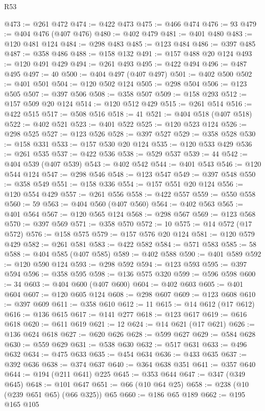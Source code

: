 \begin{lexlean}{R53}
\begin{coremodule}
@473 := @261 @472
@474 := @422 @473
@475 := @466 @474
@476 := 93
@479 := @404 @476 (@407 @476)
@480 := @402 @479
@481 := @401 @480
@483 := @120 @481 @124
@484 := @298 @483
@485 := @123 @484
@486 := @397 @485
@487 := @358 @486
@488 := @158 @132
@491 := @157 @488 @20 @124
@493 := @120 @491 @429
@494 := @261 @493
@495 := @422 @494
@496 := @487 @495
@497 := 40
@500 := @404 @497 (@407 @497)
@501 := @402 @500
@502 := @401 @501
@504 := @120 @502 @124
@505 := @298 @504
@506 := @123 @505
@507 := @397 @506
@508 := @358 @507
@509 := @158 @293
@512 := @157 @509 @20 @124
@514 := @120 @512 @429
@515 := @261 @514
@516 := @422 @515
@517 := @508 @516
@518 := 41
@521 := @404 @518 (@407 @518)
@522 := @402 @521
@523 := @401 @522
@525 := @120 @523 @124
@526 := @298 @525
@527 := @123 @526
@528 := @397 @527
@529 := @358 @528
@530 := @158 @331
@533 := @157 @530 @20 @124
@535 := @120 @533 @429
@536 := @261 @535
@537 := @422 @536
@538 := @529 @537
@539 := 44
@542 := @404 @539 (@407 @539)
@543 := @402 @542
@544 := @401 @543
@546 := @120 @544 @124
@547 := @298 @546
@548 := @123 @547
@549 := @397 @548
@550 := @358 @549
@551 := @158 @336
@554 := @157 @551 @20 @124
@556 := @120 @554 @429
@557 := @261 @556
@558 := @422 @557
@559 := @550 @558
@560 := 59
@563 := @404 @560 (@407 @560)
@564 := @402 @563
@565 := @401 @564
@567 := @120 @565 @124
@568 := @298 @567
@569 := @123 @568
@570 := @397 @569
@571 := @358 @570
@572 := 10
@575 := @14 @572 (@17 @572)
@576 := @158 @575
@579 := @157 @576 @20 @124
@581 := @120 @579 @429
@582 := @261 @581
@583 := @422 @582
@584 := @571 @583
@585 := 58
@588 := @404 @585 (@407 @585)
@589 := @402 @588
@590 := @401 @589
@592 := @120 @590 @124
@593 := @298 @592
@594 := @123 @593
@595 := @397 @594
@596 := @358 @595
@598 := @136 @575 @320
@599 := @596 @598
@600 := 34
@603 := @404 @600 (@407 @600)
@604 := @402 @603
@605 := @401 @604
@607 := @120 @605 @124
@608 := @298 @607
@609 := @123 @608
@610 := @397 @609
@611 := @358 @610
@612 := 11
@615 := @14 @612 (@17 @612)
@616 := @136 @615
@617 := @141 @277
@618 := @123 @617
@619 := @616 @618
@620 := @611 @619
@621 := 12
@624 := @14 @621 (@17 @621)
@626 := @136 @624 @618
@627 := @620 @626
@628 := @599 @627
@629 := @584 @628
@630 := @559 @629
@631 := @538 @630
@632 := @517 @631
@633 := @496 @632
@634 := @475 @633
@635 := @454 @634
@636 := @433 @635
@637 := @392 @636
@638 := @374 @637
@640 := @364 @638 @351
@641 := @357 @640
@644 := @194 (@211 @641) @225
@645 := @353 @644
@647 := @347 (@349 @645)
@648 := @101 @647
@651 := @66 (@10 @64 @25)
@658 := @238 (@10 (@239 @651 @65) (@66 @325)) @65
@660 := @186 @65 @189
@662 := @195 @165 @105

\end{coremodule}
\end{lexlean}
